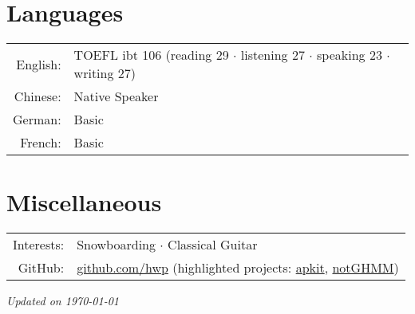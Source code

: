 \documentclass[a4paper,11pt]{article} %
\begin{document}

\section{Languages}

\begin{tabular}{rl}
  English: & TOEFL ibt 106 (reading 29 $\cdotp$ listening 27 $\cdotp$ speaking 23 $\cdotp$ writing 27) \\
  Chinese: & Native Speaker \\
  German: & Basic \\
  French: & Basic \\
\end{tabular}

\section{Miscellaneous}

\begin{tabular}{rl}
  Interests: & Snowboarding $\cdotp$ Classical Guitar \\
  GitHub: & \href{https://github.com/hwp}{github.com/hwp} (highlighted projects: \href{https://github.com/hwp/apkit}{apkit}, \href{https://github.com/hwp/notGHMM}{notGHMM}) \\
\end{tabular}



\vfill
\centering \footnotesize \itshape Updated on \today
\end{document}
